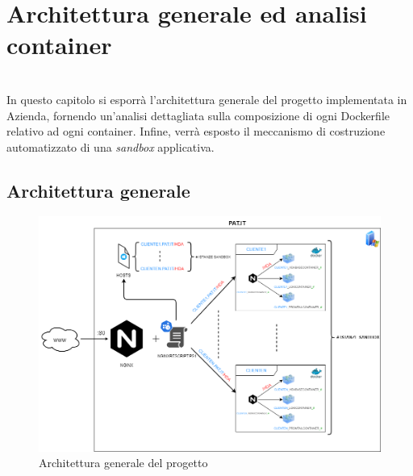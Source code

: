
\chapter{Architettura generale ed analisi container}
\label{cap:architettura-progetto-container}

\\
In questo capitolo si esporrà l'architettura generale del progetto implementata in Azienda, fornendo un'analisi dettagliata sulla composizione di ogni Dockerfile relativo ad ogni container. Infine, verrà esposto il meccanismo di costruzione automatizzato di una \textit{sandbox} applicativa.

\section{Architettura generale}
\begin{figure}[!h]     
\centering 
    \includegraphics[width=1.0\columnwidth]{immagini/img/hda_containerized_architecture} 
    \caption{Architettura generale del progetto}
\end{figure} 

